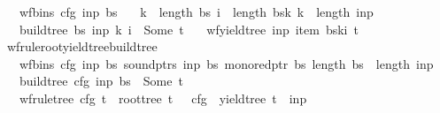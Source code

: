 \begin{isabellebody}
\ \ \ {\isachardoublequoteopen}wf{\isacharunderscore}{\kern0pt}bins\ cfg\ inp\ bs{\isachardoublequoteclose}\isanewline
\ \ \ {\isachardoublequoteopen}k\ {\isacharless}{\kern0pt}\ length\ bs{\isachardoublequoteclose}\ {\isachardoublequoteopen}i\ {\isacharless}{\kern0pt}\ length\ {\isacharparenleft}{\kern0pt}bs{\isacharbang}{\kern0pt}k{\isacharparenright}{\kern0pt}{\isachardoublequoteclose}\ {\isachardoublequoteopen}k\ {\isasymle}\ length\ inp{\isachardoublequoteclose}\isanewline
\ \ \ {\isachardoublequoteopen}build{\isacharunderscore}{\kern0pt}tree{\isacharprime}{\kern0pt}\ bs\ inp\ k\ i\ {\isacharequal}{\kern0pt}\ Some\ t{\isachardoublequoteclose}\isanewline
\ \ \ {\isachardoublequoteopen}wf{\isacharunderscore}{\kern0pt}yield{\isacharunderscore}{\kern0pt}tree\ inp\ {\isacharparenleft}{\kern0pt}item\ {\isacharparenleft}{\kern0pt}bs{\isacharbang}{\kern0pt}k{\isacharbang}{\kern0pt}i{\isacharparenright}{\kern0pt}{\isacharparenright}{\kern0pt}\ t{\isachardoublequoteclose}%
\isadelimproof
%
\endisadelimproof
%
\isatagproof
%
\endisatagproof
{\isafoldproof}%
%
\isadelimproof
\isanewline
%
\endisadelimproof
{}\isamarkupfalse%
\ wf{\isacharunderscore}{\kern0pt}rule{\isacharunderscore}{\kern0pt}root{\isacharunderscore}{\kern0pt}yield{\isacharunderscore}{\kern0pt}tree{\isacharunderscore}{\kern0pt}build{\isacharunderscore}{\kern0pt}tree{\isacharcolon}{\kern0pt}\isanewline
\ \ \ {\isachardoublequoteopen}wf{\isacharunderscore}{\kern0pt}bins\ cfg\ inp\ bs{\isachardoublequoteclose}\ {\isachardoublequoteopen}sound{\isacharunderscore}{\kern0pt}ptrs\ inp\ bs{\isachardoublequoteclose}\ {\isachardoublequoteopen}mono{\isacharunderscore}{\kern0pt}red{\isacharunderscore}{\kern0pt}ptr\ bs{\isachardoublequoteclose}\ {\isachardoublequoteopen}length\ bs\ {\isacharequal}{\kern0pt}\ length\ inp\ {\isacharplus}{\kern0pt}\ {}{\isachardoublequoteclose}\isanewline
\ \ \ {\isachardoublequoteopen}build{\isacharunderscore}{\kern0pt}tree\ cfg\ inp\ bs\ {\isacharequal}{\kern0pt}\ Some\ t{\isachardoublequoteclose}\isanewline
\ \ \ {\isachardoublequoteopen}wf{\isacharunderscore}{\kern0pt}rule{\isacharunderscore}{\kern0pt}tree\ cfg\ t\ {\isasymand}\ root{\isacharunderscore}{\kern0pt}tree\ t\ {\isacharequal}{\kern0pt}\ {\isasymSS}\ cfg\ {\isasymand}\ yield{\isacharunderscore}{\kern0pt}tree\ t\ {\isacharequal}{\kern0pt}\ inp{\isachardoublequoteclose}%
\isadelimproof
%
\endisadelimproof
%
\isatagproof
%
\endisatagproof
{\isafoldproof}%

\end{isabellebody}
